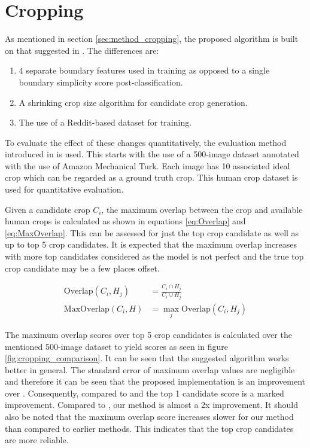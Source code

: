 \newpage
\section{Cropping\label{sec:quant_cropping}}

As mentioned in section \ref{sec:method_cropping}, the proposed algorithm is built on that suggested in \cite{fang2014automatic}.
The differences are:

\begin{enumerate}
\item 4 separate boundary features used in training as opposed to a single
      boundary simplicity score post-classification.
\item A shrinking crop size algorithm for candidate crop generation.
\item The use of a Reddit-based dataset for training.
\end{enumerate}

To evaluate the effect of these changes quantitatively, the evaluation method
introduced in \cite{fang2014automatic} is used.
This starts with the use of a 500-image dataset annotated with the use of Amazon Mechanical Turk.
Each image has 10 associated ideal crop which can be regarded as a ground truth crop.
This human crop dataset is used for quantitative evaluation.

Given a candidate crop $C_i$, the maximum overlap between the crop and available
human crops is calculated as shown in equations \ref{eq:Overlap} and \ref{eq:MaxOverlap}.
This can be assessed for just the top crop candidate as well as up to top 5 crop
candidates.
It is expected that the maximum overlap increases with more top candidates
considered as the model is not perfect and the true top crop candidate may be a
few places offset.

\begin{align}
	\mathrm{Overlap}(C_i, H_j)  &= \frac{C_i \cap H_j}{C_i \cup H_j} \label{eq:Overlap}\\
	\mathrm{MaxOverlap}(C_i, H) &= \max_j\mathrm{Overlap}(C_i, H_j)  \label{eq:MaxOverlap}
\end{align}

The maximum overlap scores over top 5 crop candidates is calculated over the
mentioned 500-image dataset to yield scores as seen in figure \ref{fig:cropping_comparison}.
It can be seen that the suggested algorithm works better in general.
The standard error of maximum overlap values are negligible and therefore it can
be seen that the proposed implementation is an improvement over \cite{fang2014automatic}.
Consequently, compared to \cite{park2012modeling} and \cite{yan2013learning} the
top 1 candidate score is a marked improvement.
Compared to \cite{yan2013learning}, our method is almost a 2x improvement.
It should also be noted that the maximum overlap score increases slower for our
method than compared to earlier methods.
This indicates that the top crop candidates are more reliable.

